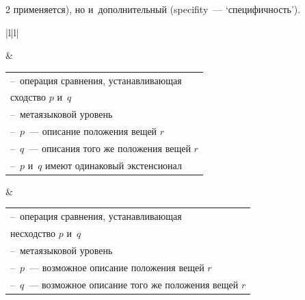\begin{multicols}{2}
применяется), но и~дополнительный (specifity~--- `специфичность'). 





\begin{table}\small  %


\begin{center}




\vspace*{2ex}





\begin{tabular}{|l|l|}


\hline


&\\


\hline


\tabcolsep=0pt\begin{tabular}{l}


--~операция сравнения, устанавливающая\\


\hphantom{--~}сходство $p$ и~$q$\\


--~метаязыковой уровень\\


--~$p$~--- описание положения вещей $r$\\


--~$q$~--- описания того же положения вещей $r$\\


--~$p$ и~$q$ имеют одинаковый экстенсионал


\end{tabular}&


\tabcolsep=0pt\begin{tabular}{l}--~операция сравнения, устанавливающая\\ 


\hphantom{--~}несходство $p$ и~$q$\\


--~метаязыковой уровень\\


--~$p$~--- возможное описание положения вещей $r$\\


--~$q$~--- возможное описание того же положения вещей $r$\\



\end{tabular}
\end{tabular}
\end{center}
\end{table}
\end{multicols}
